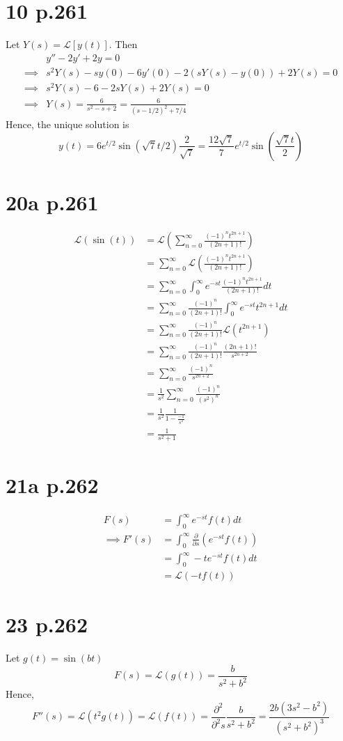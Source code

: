 \documentclass[11pt]{article}
\begin{document}
\section*{10 p.261}
Let $Y(s) = \mathcal{L}[y(t)]$. Then 
\begin{equation*}
    \begin{aligned}
        &y'' - 2y' +2y = 0\\
        \implies &s^2 Y(s) - sy(0) - 6y'(0) - 2(sY(s) - y(0)) + 2Y(s)  = 0 \\
        \implies &s^2 Y(s)  - 6 - 2sY(s) + 2Y(s) = 0 \\
        \implies &Y(s) = \frac{6}{s^2-s+2} = \frac{6}{(s-1/2)^2 +7/4}
    \end{aligned}
\end{equation*}
Hence, the unique solution is 
\[
    y(t) = 6e^{t/2} \sin(\sqrt{7}t/2) \frac{2}{\sqrt{7}} = \frac{12\sqrt{7}}{7} e^{t/2} \sin\left( \frac{\sqrt{7}t}{2}\right)
\]
\newpage
\section*{20a p.261}
\begin{equation*}
    \begin{aligned}
        \mathcal{L}(\sin(t)) 
        &= \mathcal{L}\left(\sum_{n=0}^\infty \frac{(-1)^n t^{2n+1}}{(2n+1)!}\right)  \\
        &= \sum_{n=0}^\infty \mathcal{L}\left(\frac{(-1)^n t^{2n+1}}{(2n+1)!}\right)  \\
        &= \sum_{n=0}^\infty \int_0^\infty e^{-st} \frac{(-1)^n t^{2n+1}}{(2n+1)!} dt \\
        &= \sum_{n=0}^\infty \frac{(-1)^n}{(2n+1)!} \int_0^\infty e^{-st} t^{2n+1} dt \\
        &= \sum_{n=0}^\infty \frac{(-1)^n}{(2n+1)!} \mathcal{L}(t^{2n+1}) \\
        &= \sum_{n=0}^\infty \frac{(-1)^n}{(2n+1)!} \frac{(2n+1)!}{s^{2n+2}} \\
        &= \sum_{n=0}^\infty \frac{(-1)^n}{s^{2n+2}} \\
        &= \frac{1}{s^2} \sum_{n=0}^\infty \frac{(-1)^n}{(s^2)^n} \\
        &= \frac{1}{s^2} \frac{1}{1-\frac{-1}{s^2}} \\
        &= \frac{1}{s^2+1}
    \end{aligned}
\end{equation*}
\newpage
\section*{21a p.262}
\begin{equation*}
    \begin{aligned}
        F(s) &= \int_0^\infty e^{-st} f(t) dt \\
        \implies F'(s) &= \int_0^\infty \frac{\partial}{\partial s} (e^{-st} f(t)) \\
        &= \int_0^\infty -te^{-st}f(t)dt \\
        &= \mathcal{L}(-tf(t))
    \end{aligned}
\end{equation*}
\newpage
\section*{23 p.262}
Let $g(t) = \sin(bt)$ 
\[
    F(s) = \mathcal{L}(g(t)) = \frac{b}{s^2+b^2}
\]
Hence, 
\[
    F''(s) = \mathcal{L}(t^2g(t)) = \mathcal{L}(f(t)) = \frac{\partial^2}{\partial^2 s}\frac{b}{s^2+b^2} = \dfrac{2b\left(3s^2-b^2\right)}{\left(s^2+b^2\right)^3}   
\]
\end{document}
